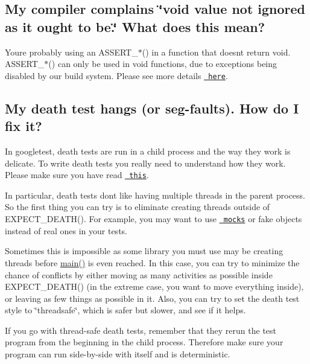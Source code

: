 \subsection*{My compiler complains \char`\"{}void value not ignored as it ought to be.\char`\"{} What does this mean?}

You\textquotesingle{}re probably using an {\ttfamily A\+S\+S\+E\+R\+T\+\_\+$\ast$()} in a function that doesn\textquotesingle{}t return {\ttfamily void}. {\ttfamily A\+S\+S\+E\+R\+T\+\_\+$\ast$()} can only be used in {\ttfamily void} functions, due to exceptions being disabled by our build system. Please see more details \href{advanced.md\#assertion-placement}{\texttt{ here}}.

\subsection*{My death test hangs (or seg-\/faults). How do I fix it?}

In googletest, death tests are run in a child process and the way they work is delicate. To write death tests you really need to understand how they work. Please make sure you have read \href{advanced.md\#how-it-works}{\texttt{ this}}.

In particular, death tests don\textquotesingle{}t like having multiple threads in the parent process. So the first thing you can try is to eliminate creating threads outside of {\ttfamily E\+X\+P\+E\+C\+T\+\_\+\+D\+E\+A\+T\+H()}. For example, you may want to use \href{../../googlemock}{\texttt{ mocks}} or fake objects instead of real ones in your tests.

Sometimes this is impossible as some library you must use may be creating threads before {\ttfamily \mbox{\hyperlink{3_814_83_2CompilerIdC_2CMakeCCompilerId_8c_a0ddf1224851353fc92bfbff6f499fa97}{main()}}} is even reached. In this case, you can try to minimize the chance of conflicts by either moving as many activities as possible inside {\ttfamily E\+X\+P\+E\+C\+T\+\_\+\+D\+E\+A\+T\+H()} (in the extreme case, you want to move everything inside), or leaving as few things as possible in it. Also, you can try to set the death test style to {\ttfamily \char`\"{}threadsafe\char`\"{}}, which is safer but slower, and see if it helps.

If you go with thread-\/safe death tests, remember that they rerun the test program from the beginning in the child process. Therefore make sure your program can run side-\/by-\/side with itself and is deterministic.

